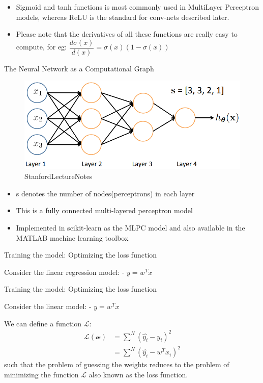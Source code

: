 \documentclass[11pt]{article}
\makeatletter
\def\maxwidth{\ifdim\Gin@nat@width>\linewidth\linewidth
    \else\Gin@nat@width\fi}
\let\Oldincludegraphics\includegraphics
\renewcommand{\includegraphics}[1]{\Oldincludegraphics[width=.8\maxwidth]{#1}}
\providecommand{\tightlist}{%
      \setlength{\itemsep}{0pt}\setlength{\parskip}{0pt}}
\makeatother
\begin{document}
\begin{itemize}
\tightlist
\item
  Sigmoid and tanh functions is most commonly used in MultiLayer
  Perceptron models, whereas ReLU is the standard for conv-nets
  described later.
\item
  Please note that the derivatives of all these functions are really
  easy to compute, for eg:
  \(\dfrac{d \sigma(x)}{d(x)} = \sigma(x)(1-\sigma(x))\)
\end{itemize}

    The Neural Network as a Computational Graph

\begin{figure}
\centering
\includegraphics{pres_imgs/graph_representation.png}
\caption{StanfordLectureNotes}
\end{figure}

\begin{itemize}
\tightlist
\item
  s denotes the number of nodes(perceptrons) in each layer
\item
  This is a fully connected multi-layered perceptron model
\item
  Implemented in scikit-learn as the MLPC model and also available in
  the MATLAB machine learning toolbox
\end{itemize}

    Training the model: Optimizing the loss function

Consider the linear regression model: - \(y = w^Tx\)

    Training the model: Optimizing the loss function

Consider the linear model: - \(y = w^Tx\)

We can define a function \(\mathcal{L}\): \begin{align}
    \mathcal{L(w)} &= \sum^{N}(\hat{y_i} - y_i)^2\\
    &= \sum^{N}(\hat{y_i} - w^Tx_i)^2
\end{align} such that the problem of guessing the weights reduces to the
problem of minimizing the function \(\mathcal{L}\) also known as the
loss function.
\end{document}
